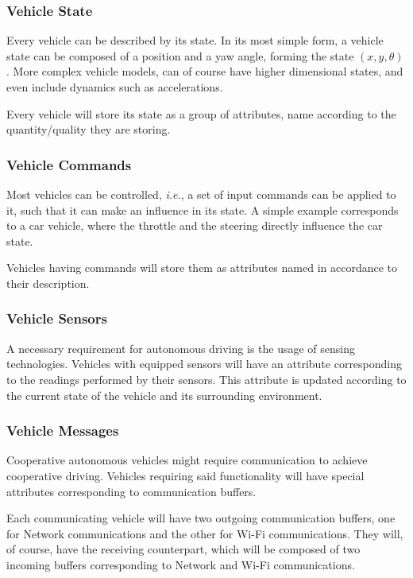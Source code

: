 \subsubsection{Vehicle State}

Every vehicle can be described by its state. In its most simple form, a vehicle state can be composed of a position and a yaw angle, forming the state $(x,y,\theta)$. More complex vehicle models, can of course have higher dimensional states, and even include dynamics such as accelerations.

Every vehicle will store its state as a group of attributes, name according to the quantity/quality they are storing.

\subsubsection{Vehicle Commands}

Most vehicles can be controlled, \textit{i.e.}, a set of input commands can be applied to it, such that it can make an influence in its state. A simple example corresponds to a car vehicle, where the throttle and the steering directly influence the car state.

Vehicles having commands will store them as attributes named in accordance to their description.

\subsubsection{Vehicle Sensors}

A necessary requirement for autonomous driving is the usage of sensing technologies. Vehicles with equipped sensors will have an attribute corresponding to the readings performed by their sensors. This attribute is updated according to the current state of the vehicle and its surrounding environment.

\subsubsection{Vehicle Messages}

Cooperative autonomous vehicles might require communication to achieve cooperative driving. Vehicles requiring said functionality will have special attributes corresponding to communication buffers.

Each communicating vehicle will have two outgoing communication buffers, one for Network communications and the other for Wi-Fi communications. They will, of course, have the receiving counterpart, which will be composed of two incoming buffers corresponding to Network and Wi-Fi communications.

